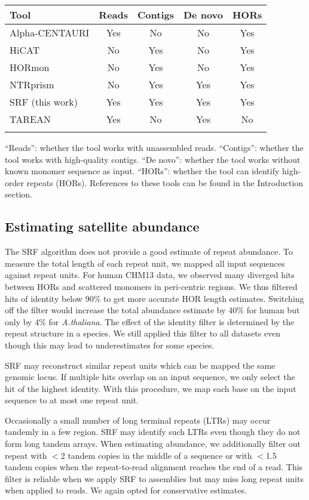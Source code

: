 \documentclass{bioinfo}
\begin{document}
\begin{table}[!hb]
{\label{tab:tool}
\begin{tabular}{p{3.6cm}cccc}
\toprule
Tool & Reads & Contigs & De novo & HORs \\
\midrule
Alpha-CENTAURI & Yes & No & No & Yes \\
HiCAT    & No & Yes & No & Yes \\
HORmon   & No & Yes & No & Yes \\
NTRprism & No & Yes & Yes  & Yes \\
SRF (this work) & Yes & Yes & Yes  & Yes \\
TAREAN   & Yes& No  & Yes  & No \\
\botrule
\end{tabular}}{``Reads'': whether the tool works with unassembled reads.
``Contigs'': whether the tool works with high-quality contigs. ``De novo'':
whether the tool works without known monomer sequence as input. ``HORs'':
whether the tool can identify high-order repeats (HORs). References to these
tools can be found in the Introduction section.}
\end{table}

\subsection{Estimating satellite abundance}

The SRF algorithm does not provide a good estimate of repeat abundance. To
measure the total length of each repeat unit, we mapped all input sequences
against repeat units. For human CHM13 data, we observed many diverged hits
between HORs and scattered monomers in peri-centric regions. We thus filtered
hits of identity below 90\% to get more accurate HOR length estimates.
Switching off the filter would increase the total abundance estimate by 40\%
for human but only by 4\% for \emph{A.thaliana}. The effect of the identity
filter is determined by the repeat structure in a species. We still applied
this filter to all datasets even though this may lead to underestimates for
some species.

SRF may reconstruct similar repeat units which can be mapped the same genomic
locus.  If multiple hits overlap on an input sequence, we only select the hit
of the highest identity. With this procedure, we map each base on the input
sequence to at most one repeat unit.

Occasionally a small number of long terminal repeats (LTRs) may occur tandemly
in a few region. SRF may identify such LTRs even though they do not form long
tandem arrays. When estimating abundance, we additionally filter out repeat
with $<$2 tandem copies in the middle of a sequence or with $<$1.5 tandem
copies when the repeat-to-read alignment reaches the end of a read. This filter
is reliable when we apply SRF to assemblies but may miss long repeat units when
applied to reads. We again opted for conservative estimates.
\end{document}
